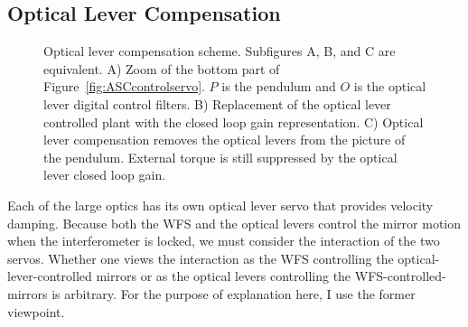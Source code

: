 \subsection{Optical Lever Compensation}

\begin{figure} 
\begin{centering} 
\caption[Optical lever compensation scheme]{Optical lever compensation scheme. Subfigures A, B, and C are equivalent. A) Zoom of the bottom part of Figure~\ref{fig:ASCcontrolservo}. $P$ is the pendulum and $O$ is the optical lever digital control filters. B) Replacement of the optical lever controlled plant with the closed loop gain representation. C) Optical lever compensation removes the optical levers from the picture of the pendulum. External torque is still suppressed by the optical lever closed loop gain.}
\label{fig:OLcomp} 
\end{centering} 
\end{figure}

\label{sec:oplevcomp}
Each of the large optics has its own optical lever servo that provides velocity damping. Because both the WFS and the optical levers control the mirror motion when the interferometer is locked, we must consider the interaction of the two servos. Whether one views the interaction as the WFS controlling the optical-lever-controlled mirrors or as the optical levers controlling the WFS-controlled-mirrors is arbitrary. For the purpose of explanation here, I use the former viewpoint.


